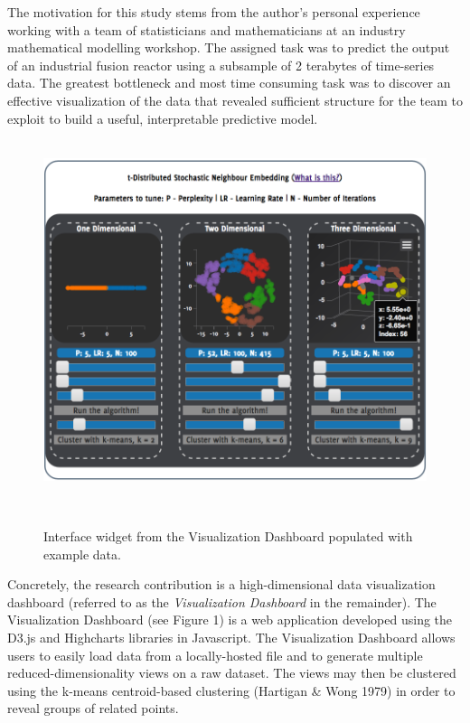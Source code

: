 \documentclass{sigchi}
\begin{document}
%
The motivation for this study stems from the author's personal experience working with a team of statisticians and mathematicians at an industry mathematical modelling workshop. %
%
The assigned task was to predict the output of an industrial fusion reactor using a subsample of 2 terabytes of time-series data. %
%
The greatest bottleneck and most time consuming task was to discover an effective visualization of the data that revealed sufficient structure for the team to exploit to build a useful, interpretable predictive model.%
%
\\\\%
%
\begin{figure}
  \centering
  \includegraphics[width=.99\columnwidth]{figures/main_populated}
  \caption{Interface widget from the Visualization Dashboard populated with example data.}~\label{fig:figure1}
\end{figure}
%
Concretely, the research contribution is a high-dimensional data visualization dashboard (referred to as the \textit{Visualization Dashboard} in the remainder). %
%
The Visualization Dashboard (see Figure 1) is a web application developed using the D3.js \cite{d3js} and Highcharts libraries in Javascript. %
%
The Visualization Dashboard allows users to easily load data from a locally-hosted file and to generate multiple reduced-dimensionality views on a raw dataset. %
%
%
The views may then be clustered using the k-means centroid-based clustering (Hartigan \& Wong 1979) in order to reveal groups of related points. %
\end{document}
